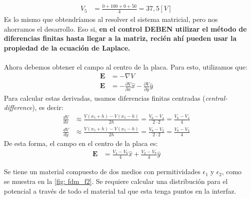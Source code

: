 \documentclass[
  11pt,
  letterpaper,
   answers
  ]{exam}
\begin{document}
\begin{questions}
\begin{solution}
\begin{align}
    V_5 &= \frac{0 + 100 + 0 + 50}{4} = 37,5 [V]
\end{align}
Es lo mismo que obtendríamos al resolver el sistema matricial, pero nos ahorramos el desarrollo. Eso si, \textbf{en el control DEBEN utilizar el método de diferencias finitas hasta llegar a la matriz, recién ahí pueden usar la propiedad de la ecuación de Laplace.} 
\\
\\
Ahora debemos obtener el campo al centro de la placa. Para esto, utilizamos que:
\begin{align}
    \mathbf{E} &= - \nabla V \\
    \mathbf{E} &= - \frac{\partial V}{\partial x} \hat{x}- \frac{\partial V}{\partial y} \hat{y}
\end{align}
Para calcular estas derivadas, usamos diferencias finitas centradas (\textit{central-difference}), es decir: 
\begin{align}
    \frac{d V}{dx} & \approx \frac{V(x_5 + h) - V(x_5 - h)}{2h} = \frac{V_6 - V_4}{2 \cdot 2} = \frac{V_6 - V_4}{4} \\
    \frac{d V}{dy} & \approx \frac{V(x_5 + h) - V(x_5 - h)}{2h} = \frac{V_8 - V_2}{2 \cdot 2} = \frac{V_8 - V_2}{4}
\end{align}
De esta forma, el campo en el centro de la placa es:
\begin{align}
    \mathbf{E} &= \frac{V_4 - V_6}{4} \hat{x} + \frac{V_2 - V_8}{4} \hat{y}
\end{align}
\end{solution}

\question \label{q: FDM_2} Se tiene un material compuesto de dos medios con permitividades $\epsilon_1$ y $\epsilon_2$, como se muestra en la \cref{fig: fdm_f2}. Se requiere calcular una distribución para el potencial a través de todo el material tal que esta tenga puntos en la interfaz.
\vspace{0.3cm}
  \begin{center}
\end{center}
\end{questions}
\end{document}
